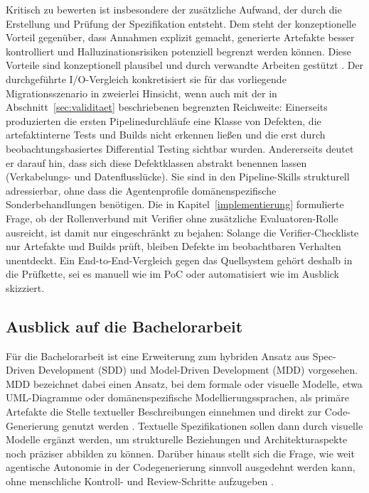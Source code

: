Kritisch zu bewerten ist insbesondere der zusätzliche Aufwand, der durch die Erstellung und Prüfung der Spezifikation entsteht. Dem steht der konzeptionelle Vorteil gegenüber, dass Annahmen explizit gemacht, generierte Artefakte besser kontrolliert und Halluzinationsrisiken potenziell begrenzt werden können. Diese Vorteile sind konzeptionell plausibel und durch verwandte Arbeiten gestützt \parencite{midolo2026promptguidelines}. Der durchgeführte I/O-Vergleich konkretisiert sie für das vorliegende Migrationsszenario in zweierlei Hinsicht, wenn auch mit der in Abschnitt~\ref{sec:validitaet} beschriebenen begrenzten Reichweite: Einerseits produzierten die ersten Pipelinedurchläufe eine Klasse von Defekten, die artefaktinterne Tests und Builds nicht erkennen ließen und die erst durch beobachtungsbasiertes Differential Testing sichtbar wurden. Andererseits deutet er darauf hin, dass sich diese Defektklassen abstrakt benennen lassen (Verkabelungs- und Datenflusslücke). Sie sind in den Pipeline-Skills strukturell adressierbar, ohne dass die Agentenprofile domänenspezifische Sonderbehandlungen benötigen. Die in Kapitel~\ref{implementierung} formulierte Frage, ob der Rollenverbund mit Verifier ohne zusätzliche Evaluatoren-Rolle ausreicht, ist damit nur eingeschränkt zu bejahen: Solange die Verifier-Checkliste nur Artefakte und Builds prüft, bleiben Defekte im beobachtbaren Verhalten unentdeckt. Ein End-to-End-Vergleich gegen das Quellsystem gehört deshalb in die Prüfkette, sei es manuell wie im PoC oder automatisiert wie im Ausblick skizziert.

\subsection{Ausblick auf die Bachelorarbeit}

Für die Bachelorarbeit ist eine Erweiterung zum hybriden Ansatz aus Spec-Driven Development (SDD) und Model-Driven Development (MDD) vorgesehen. MDD bezeichnet dabei einen Ansatz, bei dem formale oder visuelle Modelle, etwa UML-Diagramme oder domänenspezifische Modellierungssprachen, als primäre Artefakte die Stelle textueller Beschreibungen einnehmen und direkt zur Code-Generierung genutzt werden \parencite{raibulet2017mdre}. Textuelle Spezifikationen sollen dann durch visuelle Modelle ergänzt werden, um strukturelle Beziehungen und Architekturaspekte noch präziser abbilden zu können. Darüber hinaus stellt sich die Frage, wie weit agentische Autonomie in der Codegenerierung sinnvoll ausgedehnt werden kann, ohne menschliche Kontroll- und Review-Schritte aufzugeben \parencite{boeckeler2025autonomy}.

